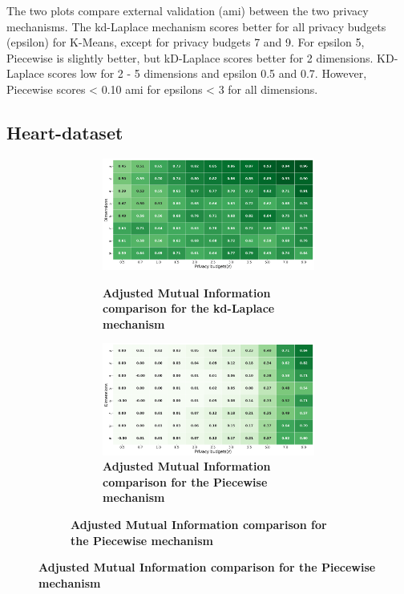 The two plots compare external validation (\gls{ami}) between the two privacy mechanisms.
The kd-Laplace mechanism scores better for all privacy budgets (epsilon) for K-Means, except for privacy budgets 7 and 9.
For epsilon 5, Piecewise is slightly better, but kD-Laplace scores better for 2 dimensions.
KD-Laplace scores low for 2 - 5 dimensions and epsilon 0.5 and 0.7.
However, Piecewise scores < 0.10 \gls{ami} for epsilons < 3 for all dimensions.
\newpage
\subsection{Heart-dataset}
\begin{figure}[H]
      \centering
      \begin{subfigure}[b]{0.90\textwidth}
            \begin{subfigure}[c]{1\textwidth}
                  \caption{\textbf{Adjusted Mutual Information comparison for the kd-Laplace mechanism}}
                  \includegraphics[width=1\textwidth]{Results/kd-laplace/kd-Laplace/heart-dataset/ami.png}
                  \label{fig:ami_heart-dataset_comparison_kdlaplace_2d}
            \end{subfigure}
            \vfill %
            \begin{subfigure}[c]{1\textwidth}
                  \caption{\textbf{Adjusted Mutual Information comparison for the Piecewise mechanism}}
                  \includegraphics[width=1\textwidth]{Results/kd-laplace/piecewise/heart-dataset/ami.png}

\end{subfigure}
\end{subfigure}
\end{figure}
